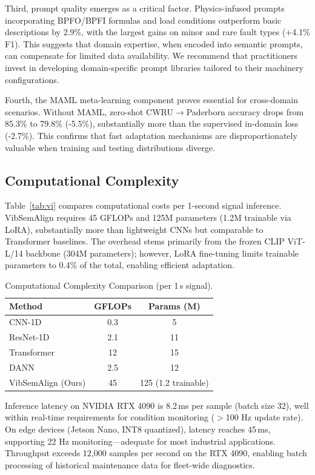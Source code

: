 Third, prompt quality emerges as a critical factor. Physics-infused prompts incorporating BPFO/BPFI formulas and load conditions outperform basic descriptions by 2.9\%, with the largest gains on minor and rare fault types (+4.1\% F1). This suggests that domain expertise, when encoded into semantic prompts, can compensate for limited data availability. We recommend that practitioners invest in developing domain-specific prompt libraries tailored to their machinery configurations.

Fourth, the MAML meta-learning component proves essential for cross-domain scenarios. Without MAML, zero-shot CWRU$\to$Paderborn accuracy drops from 85.3\% to 79.8\% (-5.5\%), substantially more than the supervised in-domain loss (-2.7\%). This confirms that fast adaptation mechanisms are disproportionately valuable when training and testing distributions diverge.

\subsection{Computational Complexity}

Table~\ref{tab:vi} compares computational costs per 1-second signal inference. VibSemAlign requires 45 GFLOPs and 125M parameters (1.2M trainable via LoRA), substantially more than lightweight CNNs but comparable to Transformer baselines. The overhead stems primarily from the frozen CLIP ViT-L/14 backbone (304M parameters); however, LoRA fine-tuning limits trainable parameters to 0.4\% of the total, enabling efficient adaptation.

\begin{table}[t]
\centering
\caption{Computational Complexity Comparison (per 1\,s signal).}
\label{tab:vii}
\begin{tabular}{@{}lcc@{}}
\toprule
Method & GFLOPs & Params (M) \\
\midrule
CNN-1D \cite{wen2019convolutional} & 0.3 & 5 \\
ResNet-1D \cite{he2016deep} & 2.1 & 11 \\
Transformer \cite{vaswani2017attention} & 12 & 15 \\
DANN \cite{ganin2016domain} & 2.5 & 12 \\
\midrule
VibSemAlign (Ours) & 45 & 125 (1.2 trainable) \\
\bottomrule
\end{tabular}
\end{table}

Inference latency on NVIDIA RTX 4090 is 8.2\,ms per sample (batch size 32), well within real-time requirements for condition monitoring ($>$100 Hz update rate). On edge devices (Jetson Nano, INT8 quantized), latency reaches 45\,ms, supporting 22 Hz monitoring---adequate for most industrial applications. Throughput exceeds 12,000 samples per second on the RTX 4090, enabling batch processing of historical maintenance data for fleet-wide diagnostics.

